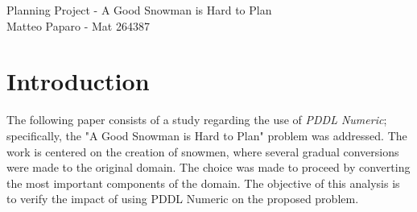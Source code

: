 \documentclass{article}
\begin{document}
\begin{center}
Planning Project - A Good Snowman is Hard to Plan\\
Matteo Paparo - Mat 264387
\end{center}
\clearpage
\section*{Introduction}
The 
following paper consists of a study regarding the use of \textit{PDDL Numeric}; specifically, the 
"A Good Snowman is Hard to Plan" problem was addressed.
The work is centered on the creation of snowmen, where several gradual conversions were made to the original domain. The choice was made to proceed by converting the most important components of the domain.
The objective of this analysis is to verify the impact of using PDDL Numeric on the proposed problem.
\end{document}
